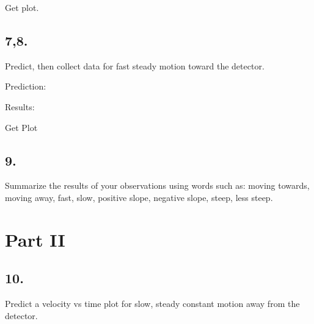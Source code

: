     \begin{mdframed}
        Get plot.
    \end{mdframed}

    \pagebreak

    \subsection*{7,8.}
    Predict, then collect data for fast steady motion toward the detector.

    \begin{mdframed}
        \centering Prediction:


        Results:

        Get Plot
    \end{mdframed}

    \subsection*{9.}
    Summarize the results of your observations using words such as: moving towards, moving away, fast, slow, positive slope, negative slope, steep, less steep.

    \begin{mdframed}
        
    \end{mdframed}

    \section*{Part II}

    \subsection*{10.}
    Predict a velocity vs time plot for slow, steady constant motion away from the detector. 

    \begin{mdframed}
        
    \end{mdframed}

